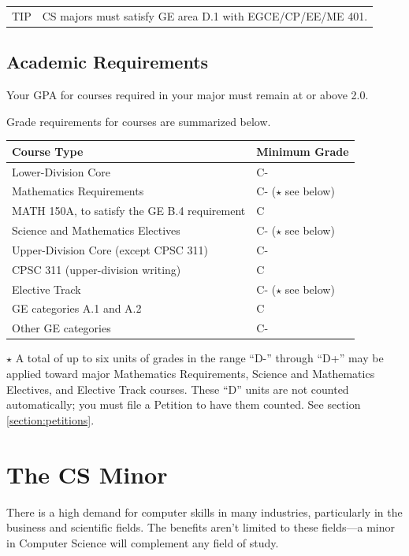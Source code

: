 \documentclass{book}
\newenvironment{tip}{
  \tcolorbox \begin{tabular}{m{.5in} m{5in}} \Large{TIP} &
}{
  \end{tabular} \endtcolorbox
}
\begin{document}
\begin{tip}
CS majors must satisfy GE area D.1 with EGCE/CP/EE/ME 401.
\end{tip}

\section{Academic Requirements}

Your GPA for courses required in your major must remain at or above 2.0.

Grade requirements for courses are summarized below.

\begin{center}
\begin{tabular}{|l|l|} \hline
  \textbf{Course Type} & \textbf{Minimum Grade} \\ \hline
  Lower-Division Core & C- \\ \hline
  Mathematics Requirements & C- ($\star$ see below) \\ \hline
  MATH 150A, to satisfy the GE B.4 requirement & C \\ \hline
  Science and Mathematics Electives & C- ($\star$ see below) \\ \hline
  Upper-Division Core (except CPSC 311) & C- \\ \hline
  CPSC 311 (upper-division writing) & C \\ \hline
  Elective Track & C- ($\star$ see below) \\ \hline
  GE categories A.1 and A.2 & C \\ \hline
  Other GE categories & C- \\ \hline
\end{tabular}
\end{center}

$\star$ A total of up to six units of grades in the range ``D-'' through ``D+'' may be applied toward major Mathematics Requirements, Science and Mathematics Electives, and Elective Track courses. These ``D'' units are not counted automatically; you must file a Petition to have them counted. See section \ref{section:petitions}.

\chapter{The CS Minor}

There is a high demand for computer skills in many industries, particularly in the business and scientific fields. The benefits aren't limited to these fields---a minor in Computer Science will complement any field of study.
\end{document}
